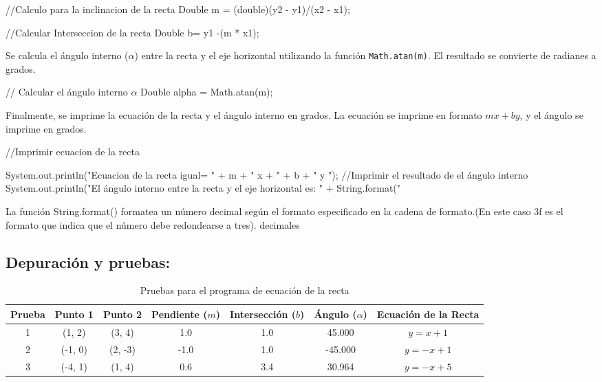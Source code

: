 \begin{javaCode}
    //Calculo para la inclinacion de la recta  
    Double m = (double)(y2 - y1)/(x2 - x1);
       
    //Calcular Interseccion de la recta
    Double b= y1 -(m * x1);
\end{javaCode}
Se calcula el ángulo interno (\(\alpha\)) entre la recta y el eje horizontal utilizando la función \texttt{Math.atan(m)}. El resultado se convierte de radianes a grados.\\
\begin{javaCode}
    // Calcular el ángulo interno $\alpha$
        Double alpha = Math.atan(m);
        
\end{javaCode}
Finalmente, se imprime la ecuación de la recta y el ángulo interno en grados. La ecuación se imprime en formato \(mx + by\), y el ángulo se imprime en grados.
\begin{javaCode}
   //Imprimir ecuacion de la recta
        
        System.out.println("Ecuacion de la recta igual= \n" +
                 m + " x + " + b + " y ");
       //Imprimir el resultado de el ángulo interno 
        System.out.println("El ángulo interno entre la recta y el eje horizontal es: " 
                + String.format("%
                
\end{javaCode}
La función String.format() formatea un número decimal según el formato especificado en la cadena de formato.(En este caso 3f es el formato que indica que el número debe redondearse a tres). decimales
\subsection{\textbf{Depuración y pruebas:}}
\begin{table}[ht]
    \centering
    \begin{tabular}{|c|c|c|c|c|c|c|}
        \hline
        \textbf{Prueba} & \textbf{Punto 1} & \textbf{Punto 2} & \textbf{Pendiente (\(m\))} & \textbf{Intersección (\(b\))} & \textbf{Ángulo (\(\alpha\))} & \textbf{Ecuación de la Recta} \\
        \hline
        1 & (1, 2) & (3, 4) & 1.0 & 1.0 & 45.000 & \(y = x + 1\) \\
        \hline
        2 & (-1, 0) & (2, -3) & -1.0 & 1.0 & -45.000 & \(y = -x + 1\) \\
        \hline
        3 & (-4, 1) & (1, 4) & 0.6 & 3.4 & 30.964 & \(y = -x + 5\) \\
        \hline
    \end{tabular}
    \caption{Pruebas para el programa de ecuación de la recta}
    \label{tab:pruebas}
\end{table}
